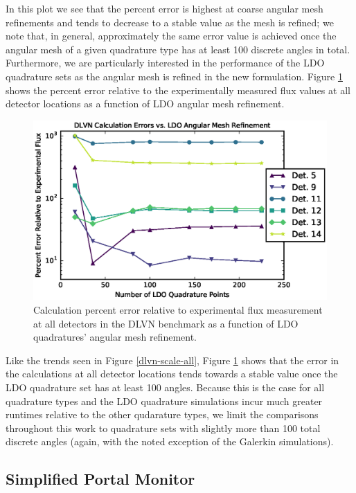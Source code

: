 \documentclass{article} %
\begin{document}
In this plot we see that the percent error is highest at coarse angular mesh
refinements and tends to decrease to a stable value as the mesh is refined; we
note that, in general, approximately the same error value is achieved once the
angular mesh of a given quadrature type has at least 100 discrete angles in
total. Furthermore, we are particularly interested in the performance of the LDO
quadrature sets as the angular mesh is refined in the new formulation. Figure
\ref{dlvn-scale-ldo} shows the percent error relative to the experimentally
measured flux values at all detector locations as a function of LDO angular
mesh refinement.

\begin{figure}[!htb]
\centering
\includegraphics{dlvn-error-scale-ldo.eps}
\caption{Calculation percent error relative to experimental flux 
         measurement at all detectors in the DLVN benchmark as a function of 
         LDO quadratures' angular mesh refinement.}
\label{dlvn-scale-ldo}
\end{figure}

Like the trends seen in Figure \ref{dlvn-scale-all}, Figure \ref{dlvn-scale-ldo}
shows that the error in the calculations at all detector locations tends
towards a stable value once the LDO quadrature set has at least 100 angles.
Because this is the case for all quadrature types and the LDO quadrature
simulations incur much greater runtimes relative to the other qudarature
types, we limit the comparisons throughout this work to quadrature sets with
slightly more than 100 total discrete angles (again, with the noted exception
of the Galerkin simulations).

\FloatBarrier
\subsection{Simplified Portal Monitor}
\end{document}
